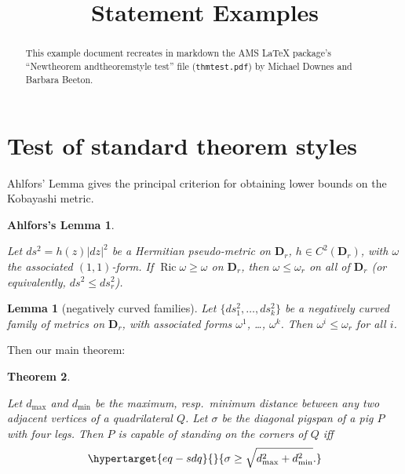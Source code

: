 \documentclass[
  letterpaper,
  DIV=11,
  numbers=noendperiod]{scrartcl}
\title{Statement Examples}
\author{}
\date{}
\theoremstyle{plain}
\newtheorem*{sta_ahlfors_s_lemma}{Ahlfors's Lemma}
\theoremstyle{plain}
\newtheorem{theorem}{Theorem}[section]
\theoremstyle{plain}
\newtheorem{lemma}[theorem]{Lemma}
\theoremstyle{plain}
\theoremstyle{plain}
\theoremstyle{exercise}
\theoremstyle{note}
\theoremstyle{break}
\theoremstyle{citing}
\begin{document}
\maketitle
\begin{abstract}
This example document recreates in markdown the AMS LaTeX package's
``Newtheorem andtheoremstyle test'' file (\texttt{thmtest.pdf}) by
Michael Downes and Barbara Beeton.
\end{abstract}
\ifdefined\Shaded\renewenvironment{Shaded}{\begin{tcolorbox}[sharp corners, enhanced, interior hidden, frame hidden, borderline west={3pt}{0pt}{shadecolor}, breakable, boxrule=0pt]}{\end{tcolorbox}}\fi

\hypertarget{test-of-standard-theorem-styles}{%
\section{Test of standard theorem
styles}\label{test-of-standard-theorem-styles}}

Ahlfors' Lemma gives the principal criterion for obtaining lower bounds
on the Kobayashi metric.

\begin{sta_ahlfors_s_lemma}\protect\hypertarget{ahlforsuxfffd--s-lemma}{}{}

Let \(ds^2 = h(z)|dz|^2\) be a Hermitian pseudo-metric on
\(\mathbf{D}_r\), \(h\in C^2(\mathbf{D}_r)\), with \(\omega\) the
associated \((1,1)\)-form. If
\(\mathop{\mathrm{Ric}}\nolimits\omega\geq\omega\) on \(\mathbf{D}_r\),
then \(\omega\leq\omega_r\) on all of \(\mathbf{D}_r\) (or equivalently,
\(ds^2\leq ds_r^2\)).

\end{sta_ahlfors_s_lemma}

\begin{lemma}[negatively curved families]

Let \(\{ds_1^2,\dots,ds_k^2\}\) be a negatively curved family of metrics
on \(\mathbf{D}_r\), with associated forms \(\omega^1\), \ldots,
\(\omega^k\). Then \(\omega^i \leq\omega_r\) for all \(i\).

\end{lemma}

Then our main theorem:

\begin{theorem}\protect\hypertarget{pigspan}{}{}

Let \(d_{\max}\) and \(d_{\min}\) be the maximum, resp.~minimum distance
between any two adjacent vertices of a quadrilateral \(Q\). Let
\(\sigma\) be the diagonal pigspan of a pig \(P\) with four legs. Then
\(P\) is capable of standing on the corners of \(Q\) iff
\begin{equation}\protect\hypertarget{eq-sdq}{}{\sigma\geq \sqrt{d_{\max}^2+d_{\min}^2}.}\label{eq-sdq}\end{equation}

\end{theorem}
\end{document}
